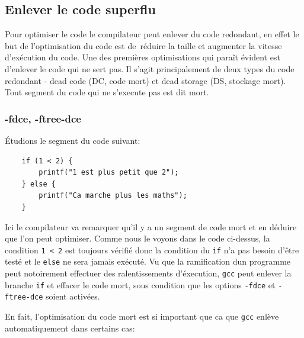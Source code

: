 \documentclass[11pt]{article} %
\begin{document}
\subsection{Enlever le code superflu}
Pour optimiser le code le compilateur peut enlever du code redondant, en effet le but de l’optimisation du code est de réduire la taille et augmenter la vitesse d’exécution du code.
Une des premières optimisations qui paraît évident est d’enlever le code qui ne sert pas. Il s'agit principalement de deux types du code redondant - dead code (DC, code mort) et dead storage (DS, stockage mort).
Tout segment du code qui ne s'execute pas est dit mort.

\subsubsection{-fdce, -ftree-dce}

\'Etudions le segment du code suivant:
\begin{verbatim}
    if (1 < 2) {
        printf("1 est plus petit que 2");
    } else {
        printf("Ca marche plus les maths");
    }
\end{verbatim}

Ici le compilateur va remarquer qu'il y a un segment de code mort et en d\'eduire que l'on peut optimiser.
Comme nous le voyons dans le code ci-dessus, la condition \verb|1 < 2| est toujours v\'erifi\'e donc la condition du \verb|if| n’a pas
besoin d’être testé et le \verb|else| ne sera jamais exécuté. Vu que la ramification dun programme peut notoirement effectuer des
ralentissements d'\'execution, \verb|gcc| peut enlever la branche \verb|if| et effacer le code mort, sous condition que les options \verb|-fdce| et
\verb|-ftree-dce| soient activ\'ees.

En fait, l'optimisation du code mort est si important que ca que \verb|gcc| enl\`eve automatiquement dans certains cas:
\end{document}
